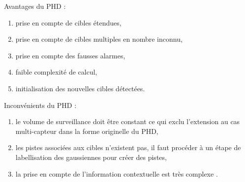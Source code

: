 \documentclass[10pt,french,a4paper]{report}
\begin{document}
 
Avantages du \ac{PHD} :
\begin{enumerate}[label=\arabic*.]
 \item prise en compte de cibles étendues,
 \item prise en compte de cibles multiples en nombre inconnu,
 \item prise en compte des fausses alarmes,  
 \item faible complexité de calcul, 
 \item initialisation des nouvelles cibles détectées.
\end{enumerate}

Inconvénients du \ac{PHD} :
\begin{enumerate}[label=\arabic*.]
\item le volume de surveillance doit être constant ce qui exclu l'extension au cas multi-capteur dans la forme originelle du \ac{PHD},
\item les pistes associées aux cibles n'existent pas, il faut procéder à un étape de labellisation des gaussiennes pour créer des pistes, 
\item  la prise en compte de l'information contextuelle est très complexe \cite{Zheng18, Ulmke07}.
\end{enumerate}
\end{document}
